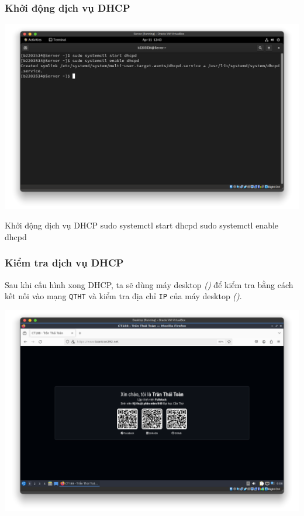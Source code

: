 \subsubsection{Khởi động dịch vụ DHCP}
\begin{minipage}{.93\linewidth}
  \captionsetup{type=figure, skip=-15pt}
  \includegraphics[width=\linewidth]{./imgs/Hinh-19.png}
  \caption{\bfseries Khởi động dịch vụ DHCP}
\end{minipage}

\vspace{0.5cm}
\begin{bashlisting}{Khởi động dịch vụ DHCP}
  sudo systemctl start dhcpd
  sudo systemctl enable dhcpd
\end{bashlisting}

\subsubsection{Kiểm tra dịch vụ DHCP}

Sau khi cấu hình xong DHCP, ta sẽ dùng máy desktop \textit{()} để kiểm tra bằng cách kết nối vào mạng \texttt{QTHT} và kiểm tra địa chỉ \texttt{IP}
của máy desktop \textit{()}.

\begin{minipage}{.93\linewidth}
  \captionsetup{type=figure, skip=-15pt}
  \includegraphics[width=\linewidth]{./imgs/Hinh-20.png}
  \caption{\bfseries Truy cập vào internet bằng máy desktop}
  \label{fig:access-website}
\end{minipage}

